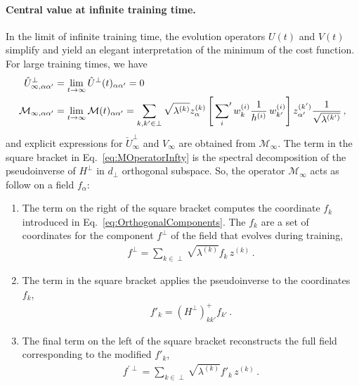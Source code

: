 \paragraph{Central value at infinite training time.}

In the limit of infinite training time, the evolution operators $U(t)$ and $V(t)$ simplify and yield an 
elegant interpretation of the minimum of the cost function. For large training times, we have
\begin{align}
    \label{eq:UhatInfty}
    \hat{U}^\perp_{\infty, \alpha\alpha'}
        &= \lim_{t\to\infty}\hat{U}^\perp(t)_{\alpha\alpha'} = 0\, \\
    \label{eq:MOperatorInfty}
    \mathcal{M}_{\infty, \alpha\alpha'} 
        &= \lim_{t\to\infty}\mathcal{M}(t)_{\alpha\alpha'} = \sum_{k,k'\in\perp} \sqrt{\lambda^{(k)}} z^{(k)}_\alpha 
        \left[\sideset{}{'}\sum_{i} w^{(i)}_{k} \frac{1}{h^{(i)}}\, 
        w^{(i)}_{k'}\right] z^{(k')}_{\alpha'} \frac{1}{\sqrt{\lambda^{(k')}}}\, ,
\end{align}
and explicit expressions for $\check{U}^\perp_{\infty}$ and $V_{\infty}$ are obtained from $\mathcal{M}_{\infty}$.
The term in the square bracket in Eq.~\eqref{eq:MOperatorInfty} is the spectral decomposition of the pseudoinverse 
of $H^\perp$ in $d_\perp$ orthogonal subspace. So, the operator $\mathcal{M}_{\infty}$ acts as follow on a field 
$f_{\alpha}$:
\begin{enumerate}
    \item The term on the right of the square bracket computes the coordinate $f_k$ introduced in 
    Eq.~\eqref{eq:OrthogonalComponents}. The $f_k$ are a set of coordinates for the component $f^\perp$ 
    of the field that evolves during training, 
    \begin{align}
        \label{eq:RightOfTheBracket}
        f^\perp = \sum_{k\in\perp} \sqrt{\lambda^{(k)}} f_k\, z^{(k)}\,  .
    \end{align}
    \item The term in the square bracket applies the pseudoinverse to the coordinates $f_k$, 
    \begin{align}
        \label{eq:ApplyPseudoInv}
        f'_k = \left(H^\perp\right)^+_{kk'} f_{k'}\, .
    \end{align}
    \item The final term on the left of the square bracket reconstructs the full field corresponding to the modified 
    $f'_{k}$,
    \begin{align}
        \label{eq:LeftOfTheBracket}
        f^{'\perp} = \sum_{k\in\perp} \sqrt{\lambda^{(k)}} f'_{k}\, z^{(k)}\, .
    \end{align}
    
\end{enumerate}

